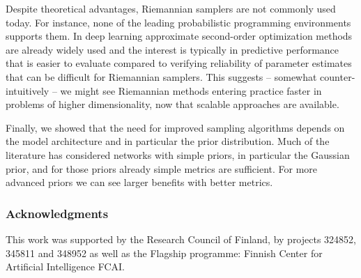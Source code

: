 \documentclass[10pt]{article} %
\theoremstyle{plain}
\theoremstyle{definition}
\theoremstyle{remark}
\begin{document}
Despite theoretical advantages, Riemannian samplers are not commonly used today. For instance, none of the leading probabilistic programming environments supports them. In deep learning approximate second-order optimization methods are already widely used and the interest is typically in predictive performance that is easier to evaluate compared to verifying reliability of parameter estimates that can be difficult for Riemannian samplers. This suggests -- somewhat counter-intuitively -- we might see Riemannian methods entering practice faster in problems of higher dimensionality, now that scalable approaches are available.

Finally, we showed that the need for improved sampling algorithms depends on the model architecture and in particular the prior distribution. Much of the literature has considered networks with simple priors, in particular the Gaussian prior, and for those priors already simple metrics are sufficient. For more advanced priors we can see larger benefits with better metrics.




\subsubsection*{Acknowledgments}

This work was supported by the Research Council of Finland, by projects 324852, 345811 and 348952 as well as the Flagship programme: Finnish Center for Artificial Intelligence FCAI.

\end{document}
